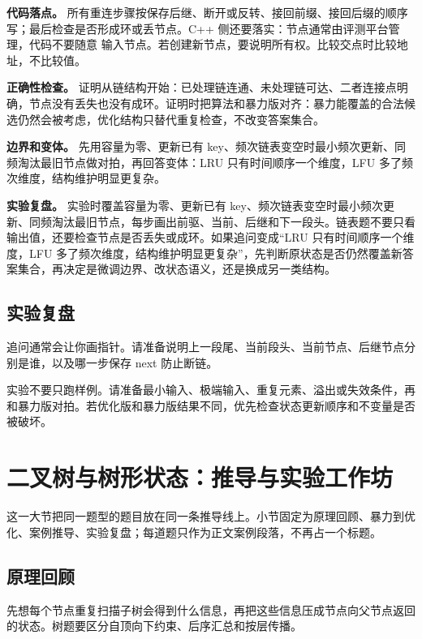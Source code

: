 \textbf{代码落点。} 所有重连步骤按保存后继、断开或反转、接回前缀、接回后缀的顺序写；最后检查是否形成环或丢节点。C++ 侧还要落实：节点通常由评测平台管理，代码不要随意  输入节点。若创建新节点，要说明所有权。比较交点时比较地址，不比较值。

\textbf{正确性检查。} 证明从链结构开始：已处理链连通、未处理链可达、二者连接点明确，节点没有丢失也没有成环。证明时把算法和暴力版对齐：暴力能覆盖的合法候选仍然会被考虑，优化结构只替代重复检查，不改变答案集合。

\textbf{边界和变体。} 先用容量为零、更新已有 key、频次链表变空时最小频次更新、同频淘汰最旧节点做对拍，再回答变体：LRU 只有时间顺序一个维度，LFU 多了频次维度，结构维护明显更复杂。

\textbf{实验复盘。} 实验时覆盖容量为零、更新已有 key、频次链表变空时最小频次更新、同频淘汰最旧节点，每步画出前驱、当前、后继和下一段头。链表题不要只看输出值，还要检查节点是否丢失或成环。如果追问变成“LRU 只有时间顺序一个维度，LFU 多了频次维度，结构维护明显更复杂”，先判断原状态是否仍然覆盖新答案集合，再决定是微调边界、改状态语义，还是换成另一类结构。

\subsection{实验复盘}

追问通常会让你画指针。请准备说明上一段尾、当前段头、当前节点、后继节点分别是谁，以及哪一步保存 next 防止断链。

实验不要只跑样例。请准备最小输入、极端输入、重复元素、溢出或失效条件，再和暴力版对拍。若优化版和暴力版结果不同，优先检查状态更新顺序和不变量是否被破坏。

\section{二叉树与树形状态：推导与实验工作坊}
这一大节把同一题型的题目放在同一条推导线上。小节固定为原理回顾、暴力到优化、案例推导、实验复盘；每道题只作为正文案例段落，不再占一个标题。

\subsection{原理回顾}

先想每个节点重复扫描子树会得到什么信息，再把这些信息压成节点向父节点返回的状态。树题要区分自顶向下约束、后序汇总和按层传播。

